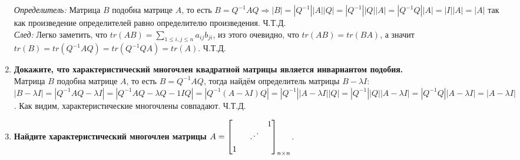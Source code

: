 \documentclass[12pt]{article} %
\begin{document}
\begin{enumerate}
    \textit{Определитель:} Матрица $B$ подобна матрице $A$, то есть $B = Q^{-1}AQ \Rightarrow |B| = |Q^{-1}||A||Q| = |Q^{-1}||Q||A| = |Q^{-1}Q||A| = |I||A| = |A|$ так как произведение определителей равно определителю произведения. Ч.Т.Д.\\

    \textit{След:} Легко заметить, что $tr(AB) = \sum \limits_{1 \leqslant i, j \leqslant n} a_{ij}b_{ji}$, из этого очевидно, что $tr(AB) = tr(BA)$, а значит $tr(B) = tr(Q^{-1}AQ) = tr(Q^{-1}QA) = tr(A)$. Ч.Т.Д.
    
    \item \textbf{Докажите, что характеристический многочлен квадратной матрицы является инвариантом подобия.}\\
    Матрица $B$ подобна матрице $A$, то есть $B = Q^{-1}AQ$, тогда найдём определитель матрицы $B - \lambda I$: $|B - \lambda I| = |Q^{-1}AQ - \lambda I| = |Q^{-1}AQ - \lambda Q^{}-1IQ| = |Q^{-1}(A - \lambda I)Q| = |Q^{-1}||A - \lambda I||Q| = |Q^{-1}||Q||A - \lambda I| = |Q^{-1}Q||A - \lambda I| = |A - \lambda I|$. Как видим, характеристические многочлены совпадают. Ч.Т.Д.
    
    \item \textbf{Найдите характеристический многочлен матрицы $A = 
    \begin{bmatrix}
         &&1\\
         &\rotatebox[origin=c]{75}{$\ddots$}&\\
         1&& \\
    \end{bmatrix}_{n \times n}
    $}.\\


\end{enumerate}
\end{document}
